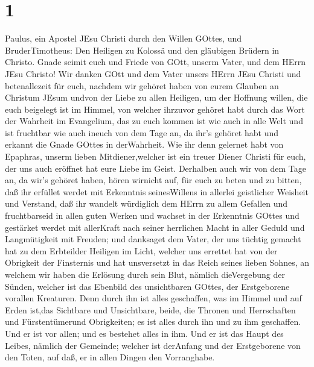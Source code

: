 \hypertarget{section}{%
\section{1}\label{section}}

 Paulus, ein Apostel JEsu Christi durch den Willen GOttes,
und BruderTimotheus:  Den Heiligen zu Kolossä und den
gläubigen Brüdern in Christo. Gnade seimit euch und Friede von GOtt,
unserm Vater, und dem HErrn JEsu Christo!  Wir danken GOtt
und dem Vater unsers HErrn JEsu Christi und betenallezeit für euch,
 nachdem wir gehöret haben von eurem Glauben an Christum
JEsum undvon der Liebe zu allen Heiligen,  um der Hoffnung
willen, die euch beigelegt ist im Himmel, von welcher ihrzuvor gehöret
habt durch das Wort der Wahrheit im Evangelium,  das zu euch
kommen ist wie auch in alle Welt und ist fruchtbar wie auch ineuch von
dem Tage an, da ihr's gehöret habt und erkannt die Gnade GOttes in
derWahrheit.  Wie ihr denn gelernet habt von Epaphras,
unserm lieben Mitdiener,welcher ist ein treuer Diener Christi für euch,
 der uns auch eröffnet hat eure Liebe im Geist. 
Derhalben auch wir von dem Tage an, da wir's gehöret haben, hören
wirnicht auf, für euch zu beten und zu bitten, daß ihr erfüllet werdet
mit Erkenntnis seinesWillens in allerlei geistlicher Weisheit und
Verstand,  daß ihr wandelt würdiglich dem HErrn zu allem
Gefallen und fruchtbarseid in allen guten Werken  und
wachset in der Erkenntnis GOttes und gestärket werdet mit allerKraft
nach seiner herrlichen Macht in aller Geduld und Langmütigkeit mit
Freuden;  und danksaget dem Vater, der uns tüchtig gemacht
hat zu dem Erbteilder Heiligen im Licht,  welcher uns
errettet hat von der Obrigkeit der Finsternis und hat unsversetzt in das
Reich seines lieben Sohnes,  an welchem wir haben die
Erlösung durch sein Blut, nämlich dieVergebung der Sünden, 
welcher ist das Ebenbild des unsichtbaren GOttes, der Erstgeborene
vorallen Kreaturen.  Denn durch ihn ist alles geschaffen,
was im Himmel und auf Erden ist,das Sichtbare und Unsichtbare, beide,
die Thronen und Herrschaften und Fürstentümerund Obrigkeiten; es ist
alles durch ihn und zu ihm geschaffen.  Und er ist vor
allen; und es bestehet alles in ihm.  Und er ist das Haupt
des Leibes, nämlich der Gemeinde; welcher ist derAnfang und der
Erstgeborene von den Toten, auf daß, er in allen Dingen den Vorranghabe.
